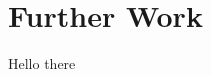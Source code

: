 \thispagestyle{plain}
\newpage
\section{Further Work}\label{sec:further-work}

\normalsize

Hello there